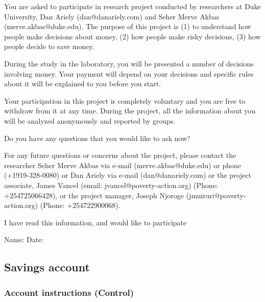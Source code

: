 \documentclass[11pt]{article}
\begin{document}
        {\setlength{\parskip}{1em} \setlength{\parindent}{0em}

        You are asked to participate in research project conducted by researchers at Duke University, Dan Ariely (dan@danariely.com) and Seher Merve Akbas (merve.akbas@duke.edu). The purpose of this project is (1) to understand how people make decisions about money, (2) how people make risky decisions, (3) how people decide to save money.

        During the study in the laboratory, you will be presented a number of decisions involving money. Your payment will depend on your decisions and specific rules about it will be explained to you before you start.

        Your participation in this project is completely voluntary and you are free to withdraw from it at any time. During the project, all the information about you will be analyzed anonymously and reported by groups.

        Do you have any questions that you would like to ask now?

        For any future questions or concerns about the project, please contact the researcher Seher Merve Akbas via e-mail (merve.akbas@duke.edu) or phone (+1919-328-0080) or Dan Ariely via e-mail (dan@danariely.com) or the project associate, James Vancel (email: jvancel@poverty-action.org) (Phone: +254725066428), or the project manager, Joseph Njoroge (jmuiruri@poverty-action.org) (Phone: +254722900068).

        I have read this information, and would like to participate

        Name: \qquad Date:

        }

    \subsection{Savings account}

        \subsubsection{Account instructions (Control)}
\end{document}
